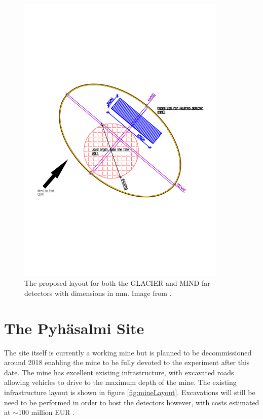 \begin{figure}[htbp]
\begin{center}
\includegraphics[width=100mm]{Chapter2/figures/glacierMindLayout.pdf}
\caption{The proposed layout for both the GLACIER and MIND far detectors with dimensions in mm. Image from \cite{lbnoInternal}.}
\label{fig:glacierMindLayout}
\end{center}
\end{figure}

\section{The Pyh\"asalmi Site}
The site itself is currently a working mine but is planned to be decommissioned around 2018 enabling the mine to be fully devoted to the experiment after this date. The mine has excellent existing infrastructure, with excavated roads allowing vehicles to drive to the maximum depth of the mine. The existing infrastructure layout is shown in figure \ref{fig:mineLayout}. Excavations will still be need to be performed in order to host the detectors however, with costs estimated at $\sim$100 million EUR \cite{lbnoInternal}. 

